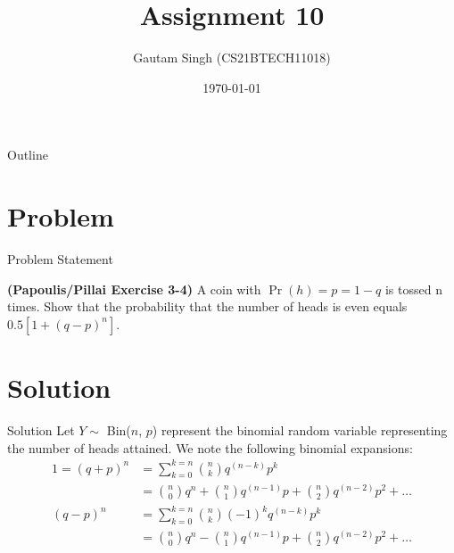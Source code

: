 \documentclass{beamer}
\title{Assignment 10}
\author{Gautam Singh (CS21BTECH11018)}
\date{\today}
\providecommand{\pr}[1]{\ensuremath{\Pr\left(#1\right)}}
\begin{document}
\begin{frame}
    \titlepage 
\end{frame}

\logo{}


\begin{frame}{Outline}
    \tableofcontents
\end{frame}


\section{Problem}
\begin{frame}{Problem Statement}

\textbf{(Papoulis/Pillai Exercise 3-4)} A coin with $\pr{h} = p = 1 - q$ is tossed n times. Show that the probability that the number
of heads is even equals $0.5[1 + (q - p)^n]$. 

\end{frame}


\section{Solution}

\begin{frame}{Solution}
    Let $Y \sim$ Bin($n$, $p$) represent the binomial random variable representing the number of heads attained. We note the following binomial expansions:
    \begin{align}
        1 = (q + p)^n &= \sum_{k = 0}^{k = n}\binom{n}{k}q^{(n - k)}p^k \\
        &= \binom{n}{0}q^n + \binom{n}{1}q^{(n - 1)}p + \binom{n}{2}q^{(n - 2)}p^2 + \ldots \label{eq:t1}\\
        (q - p)^n &= \sum_{k = 0}^{k = n}\binom{n}{k}(-1)^kq^{(n - k)}p^k \\
        &= \binom{n}{0}q^n - \binom{n}{1}q^{(n - 1)}p + \binom{n}{2}q^{(n - 2)}p^2 + \ldots \label{eq:t2}
    \end{align}
\end{frame}
\end{document}
